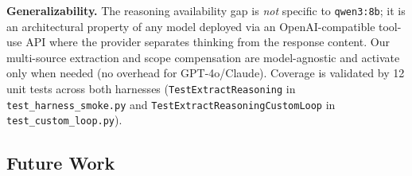 \documentclass[11pt,letterpaper]{article}
\begin{document}
\vspace{4pt}
\noindent\textbf{Generalizability.}
The reasoning availability gap is \emph{not} specific to \texttt{qwen3:8b};
it is an architectural property of any model deployed via an
OpenAI-compatible tool-use API where the provider separates thinking from
the response content.  Our multi-source extraction and scope compensation
are model-agnostic and activate only when needed (no overhead for GPT-4o/Claude).
Coverage is validated by 12 unit tests across both harnesses
(\texttt{TestExtractReasoning} in \texttt{test\_harness\_smoke.py} and
\texttt{TestExtractReasoningCustomLoop} in \texttt{test\_custom\_loop.py}).


\subsection{Future Work}
\end{document}
